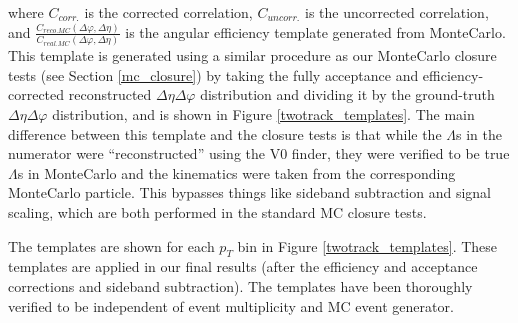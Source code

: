 \documentclass[ALICE,manyauthors]{ALICE_analysis_notes}
\begin{document}
where $C_{corr.}$ is the corrected correlation, $C_{uncorr.}$ is the uncorrected correlation, and $\frac{C_{reco. MC}(\Delta\varphi, \Delta\eta)}{C_{real. MC}(\Delta\varphi, \Delta\eta)}$ is the angular efficiency template generated from MonteCarlo. This template is generated using a similar procedure as our MonteCarlo closure tests (see Section \ref{mc_closure}) by taking the fully acceptance and efficiency-corrected reconstructed $\Delta\eta\Delta\varphi$ distribution and dividing it by the ground-truth $\Delta\eta\Delta\varphi$ distribution, and is shown in Figure \ref{twotrack_templates}. The main difference between this template and the closure tests is that while the $\Lambda$s in the numerator were ``reconstructed'' using the V0 finder, they were verified to be true $\Lambda$s in MonteCarlo and the kinematics were taken from the corresponding MonteCarlo particle. This bypasses things like sideband subtraction and signal scaling, which are both performed in the standard MC closure tests. 

The templates are shown for each $p_{T}$ bin in Figure \ref{twotrack_templates}. These templates are applied in our final results (after the efficiency and acceptance corrections and sideband subtraction). The templates have been thoroughly verified to be independent of event multiplicity and MC event generator.

\clearpage
\end{document}
